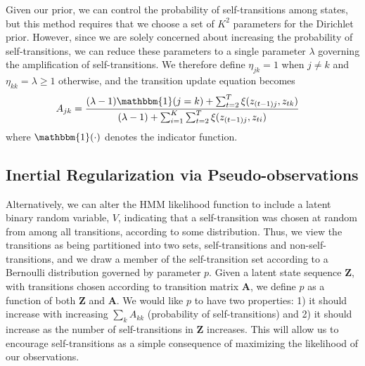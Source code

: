 \documentclass[letterpaper]{article}
\begin{document}
Given our prior, we can control the probability of self-transitions among states, but this method requires that we choose a set of $K^2$ parameters for the Dirichlet prior. However, since we are solely concerned about increasing the probability of self-transitions, we can reduce these parameters to a single parameter $\lambda$ governing the amplification of self-transitions. We therefore define $\eta_{jk} = 1$ when $j\not=k$ and $\eta_{kk}= \lambda \geq 1$ otherwise, and the transition update equation becomes
\begin{align}\label{eq:MAP-final}
    A_{jk} &= \frac{(\lambda - 1){\mathbbm{1}(j = k)} + \sum_{t=2}^{T} \xi(z_{(t-1)j}, z_{tk})}   
    {(\lambda - 1) + \sum_{i=1}^{K}\sum_{t=2}^{T} \xi(z_{(t-1)j}, z_{ti})}
\end{align}
where $\mathbbm{1}(\cdot)$ denotes the indicator function.

\subsection{Inertial Regularization via Pseudo-observations}

Alternatively, we can alter the HMM likelihood function to include a latent binary random variable,
$V$, indicating that a self-transition was chosen at random from among all transitions, according to some distribution. 
Thus, we view the transitions as being partitioned into two sets, self-transitions and non-self-transitions, and
we draw a member of the self-transition set according to a Bernoulli
distribution governed by parameter $p$. Given a latent state sequence
$\mathbf{Z}$, with transitions chosen according to transition matrix
$\mathbf{A}$, we define $p$ as a function of both $\mathbf{Z}$ and $\mathbf{A}$.
We would like $p$ to have two properties: 1) it should increase with increasing
$\sum_k A_{kk}$ (probability of self-transitions) and 2) it should increase as
the number of self-transitions in $\mathbf{Z}$ increases. This will allow us to
encourage self-transitions as a simple consequence of maximizing the likelihood
of our observations.
\end{document}

